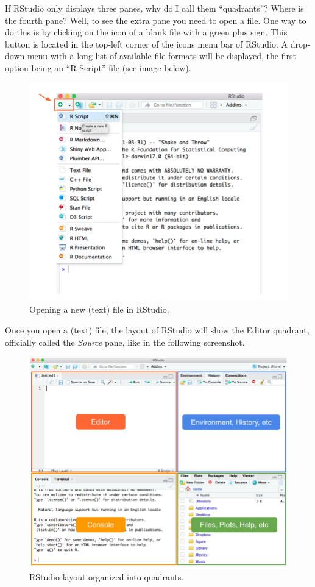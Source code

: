 \documentclass[
]{book}
\begin{document}
If RStudio only displays three panes, why do I call them ``quadrants''? Where is
the fourth pane? Well, to see the extra pane you need to open a file. One
way to do this is by clicking on the icon of a blank file with a green plus sign.
This button is located in the top-left corner of the icons menu bar of RStudio.
A drop-down menu with a long list of available file formats will be displayed,
the first option being an ``R Script'' file (see image below).

\begin{figure}

{\centering \includegraphics[width=0.7\linewidth]{images/rstudio/rstudio-new-file} 

}

\caption{Opening a new (text) file in RStudio.}\label{fig:unnamed-chunk-27}
\end{figure}

Once you open a (text) file, the layout of RStudio will show the Editor
quadrant, officially called the \emph{Source} pane, like in the following screenshot.

\begin{figure}

{\centering \includegraphics[width=0.8\linewidth]{images/rstudio/rstudio-quadrants} 

}

\caption{RStudio layout organized into quadrants.}\label{fig:unnamed-chunk-28}
\end{figure}
\end{document}
